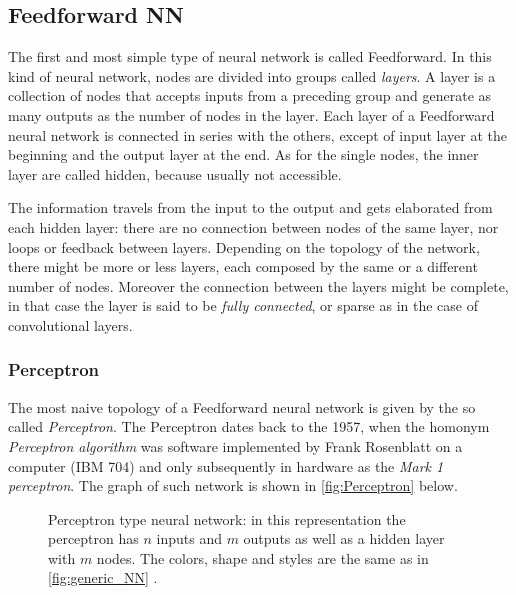 
\subsection{Feedforward NN}
\label{ssec:Feedforward_NN}

The first and most simple type of neural network is called Feedforward.
In this kind of neural network, nodes are divided into groups called \textit{layers}.
A layer is a collection of nodes that accepts inputs from a preceding group and generate as many outputs as the number of nodes in the layer.
Each layer of a Feedforward neural network is connected in series with the others, except of input layer at the beginning and the output layer at the end.
As for the single nodes, the inner layer are called hidden, because usually not accessible.

The information travels from the input to the output and gets elaborated from each hidden layer: there are no connection between nodes of the same layer, nor loops or feedback between layers.
Depending on the topology of the network, there might be more or less layers, each composed by the same or a different number of nodes.
Moreover the connection between the layers might be complete, in that case the layer is said to be \textit{fully connected}, or sparse as in the case of convolutional layers.

\subsubsection{Perceptron}
\label{sssec:Perceptron}

The most naive topology of a Feedforward neural network is given by the so called \textit{Perceptron}.
The Perceptron dates back to the 1957, when the homonym \textit{Perceptron algorithm} was software implemented by Frank Rosenblatt on a computer (IBM 704) and only subsequently in hardware as the \textit{Mark 1 perceptron}\cite{frank1957perceptron,Rosenblatt1958}.
The graph of such network is shown in \autoref{fig:Perceptron} below.

\begin{figure}[ht]
	\centering
	
	\caption{Perceptron type neural network: in this representation the perceptron has $n$ inputs and $m$ outputs as well as a hidden layer with $m$ nodes.%
		The colors, shape and styles are the same as in \autoref{fig:generic_NN} .%
		}
	\label{fig:Perceptron}
\end{figure}


